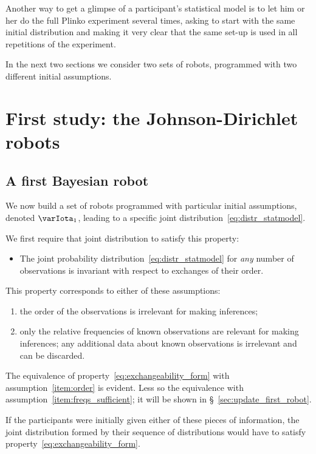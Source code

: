 \documentclass[\ifafour a4paper,12pt,\else a5paper,10pt,\fi%
onecolumn,oneside,article,%
british%
]{memoir}
\theoremstyle{remark}
\theoremstyle{innote}
\renewcommand*{\|}{\mathpunct{|}}
\newcommand*{\sect}{\S}%
\newcommand*{\yI}{\varIota}
\newcommand*{\yMJ}{\yI_1}
\begin{document}
Another way to get a glimpse of a participant's statistical model is to let
him or her do the full Plinko experiment several times, asking to start
with the same initial distribution and making it very clear that the same
set-up is used in all repetitions of the experiment.

In the next two sections we consider two sets of robots, programmed with two
different initial assumptions.

\section{First study: the Johnson-Dirichlet robots}
\label{sec:first_study}

\subsection{A first Bayesian robot}
\label{sec:bayes_robot}

We now build a set of robots programmed with particular initial
assumptions, denoted $\yMJ$, leading to a specific joint
distribution~\eqref{eq:distr_statmodel}.

We first require that joint distribution to satisfy this property:
\begin{itemize}
\item The joint probability distribution~\eqref{eq:distr_statmodel} for
  \emph{any} number of observations is invariant with respect to exchanges
  of their order.
\end{itemize}
This property corresponds to either of these assumptions:
\begin{enumerate}[label=(\textit{\alph*})]
\item\label{item:order}the order of the observations is irrelevant for
  making inferences;
\item\label{item:freqs_sufficient}only the relative frequencies of known
  observations are relevant for making inferences; any additional data
  about known observations is irrelevant and can be discarded.
\end{enumerate}
The equivalence of property~\eqref{eq:exchangeability_form} with
assumption~\ref{item:order} is evident. Less so the equivalence with
assumption~\ref{item:freqs_sufficient}; it will be shown in
\sect~\ref{sec:update_first_robot}.

If the participants were initially given either of these pieces of
information, the joint distribution formed by their sequence of
distributions would have to satisfy
property~\eqref{eq:exchangeability_form}.
\end{document}
